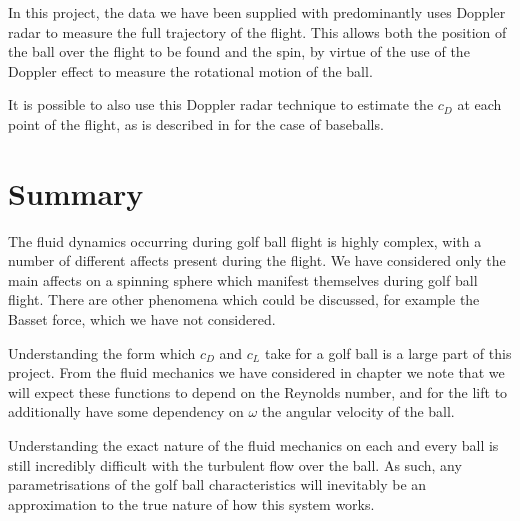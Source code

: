 In this project, the data we have been supplied with predominantly uses Doppler radar to measure the
full trajectory of the flight. This allows both the position of the ball over the flight to be found
and the spin, by virtue of the use of the Doppler effect to measure the rotational motion of the ball.

It is possible to also use this Doppler radar technique to estimate the $c_D$ at each point of the 
flight, as is described in \citet{Martin2012} for the case of baseballs.

\section{Summary}

The fluid dynamics occurring during golf ball flight is highly complex, with a number of different affects 
present during the flight. We have considered only the main affects on a spinning sphere which
manifest themselves during golf ball flight. There are other phenomena which could be discussed, 
for example the Basset force, which we have not considered.

Understanding the form which $c_D$ and $c_L$ take for a golf ball is a large part of this project.
From the fluid mechanics we have considered in chapter we note that we will expect these functions
to depend on the Reynolds number, and for the lift to additionally have some dependency on $\omega$ the
angular velocity of the ball.

Understanding the exact nature of the fluid mechanics on each and every ball is still incredibly
difficult with the turbulent flow over the ball. As such, any parametrisations of the golf ball
characteristics will inevitably be an approximation to the true nature of how this system works.